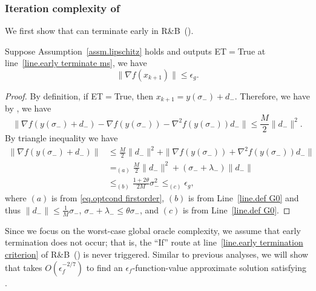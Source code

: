 \documentclass{article}
\begin{document}
\subsubsection{Iteration complexity of }
We first show that  can terminate early in R\&B~().
\begin{lemma}
    \label{lem.early termination ms}
    Suppose Assumption~\ref{assm.lipschitz} holds and  outputs ET$=$True at line~\ref{line.early terminate ms}, we have
    \begin{equation*}
        \|\nabla f(x_{k+1}) \|\leq \epsilon_g.
    \end{equation*}
\end{lemma}
\begin{proof}
    By definition, if ET$=$True, then $x_{k+1} = y(\sigma_-)+d_-$. Therefore, we have
    by , we have
    \begin{equation*}
        \|\nabla f(y(\sigma_-)+d_-)-\nabla f(y(\sigma_-))-\nabla^2 f(y(\sigma_-))d_-\|\leq \frac{M}{2}\|d_-\|^2.
    \end{equation*}
    By triangle inequality we have
    \begin{equation*}
        \begin{aligned}
            \|\nabla f(y(\sigma_-)+d_-)\| & \leq \frac{M}{2}\|d_-\|^2+\| \nabla f(y(\sigma_-))+\nabla^2 f(y(\sigma_-))d_-\| \\
                                          & =_{(a)} \frac{M}{2}\|d_-\|^2+(\sigma_-+\lambda_-) \|d_-\|                       \\
                                          & \leq_{(b)} \frac{1+2\theta}{2M}\sigma_-^2  \leq_{(c)} \epsilon_g,
        \end{aligned}
    \end{equation*}
    where $(a)$ is from \eqref{eq.optcond firstorder}, $(b)$ is from Line~\ref{line.def G0} and thus $\|d_-\| \leq \frac{1}{M}\sigma_-$, $\sigma_-+\lambda_-\leq \theta\sigma_-$, and $(c)$ is from Line~\ref{line.def G0}.
\end{proof}
Since we focus on the worst-case global oracle complexity, we assume that early termination does not occur; that is, the ``If'' route at line~\ref{line.early termination criterion} of R\&B~() is never triggered. Similar to previous analyses, we will show that  takes $O(\epsilon_f^{-2/7})$ to find an $\epsilon_f$-function-value approximate solution satisfying .
\end{document}
